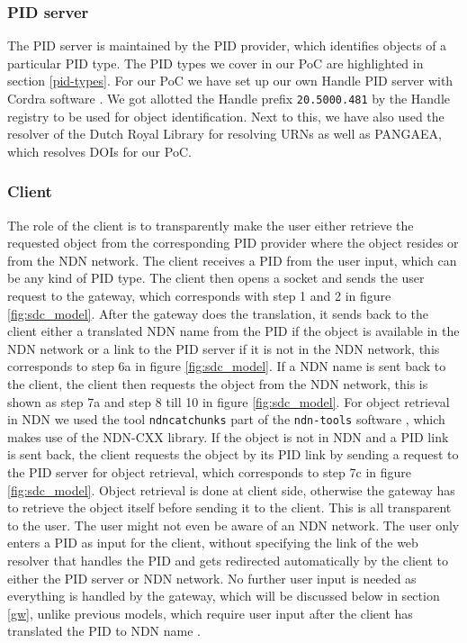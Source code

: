 \subsubsection{PID server}
The PID server is maintained by the PID provider, which identifies objects of a particular PID type. The PID types we cover in our PoC are highlighted in section \ref{pid-types}. For our PoC we have set up our own Handle PID server with Cordra software \cite{cor}. We got allotted the Handle prefix \texttt{20.5000.481} by the Handle registry to be used for object identification. Next to this, we have also used the resolver of the Dutch Royal Library for resolving URNs as well as PANGAEA, which resolves DOIs for our PoC.

\subsubsection{Client}
The role of the client is to transparently make the user either retrieve the requested object from the corresponding PID provider where the object resides or from the NDN network. 
The client receives a PID from the user input, which can be any kind of PID type. The client then opens a socket and sends the user request to the gateway, which corresponds with step 1 and 2 in figure \ref{fig:sdc_model}. After the gateway does the translation, it sends back to the client either a translated NDN name from the PID if the object is available in the NDN network or a link to the PID server if it is not in the NDN network, this corresponds to step 6a in figure \ref{fig:sdc_model}. If a NDN name is sent back to the client, the client then requests the object from the NDN network, this is shown as step 7a and step 8 till 10 in figure \ref{fig:sdc_model}. For object retrieval in NDN we used the tool \texttt{ndncatchunks} part of the \texttt{ndn-tools} software \cite{ndn-tools}, which makes use of the NDN-CXX library. If the object is not in NDN and a PID link is sent back, the client requests the object by its PID link by sending a request to the PID server for object retrieval, which corresponds to step 7c in figure \ref{fig:sdc_model}. Object retrieval is done at client side, otherwise the gateway has to retrieve the object itself before sending it to the client.
This is all transparent to the user. The user might not even be aware of an NDN network. The user only enters a PID as input for the client, without specifying the link of the web resolver that handles the PID and gets redirected automatically by the client to either the PID server or NDN network. No further user input is needed as everything is handled by the gateway, which will be discussed below in section \ref{gw}, %
unlike previous models, which require user input after the client has translated the PID to NDN name \cite{ndn-app-aware}. 

